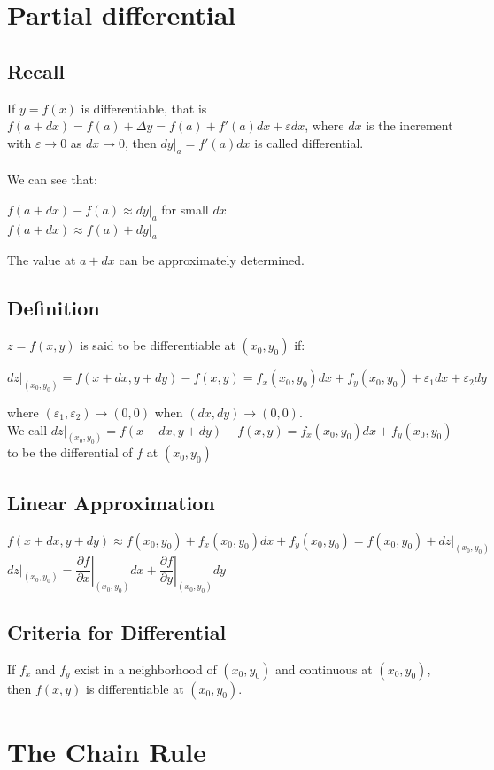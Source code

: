 \documentclass[UTF8,a4paper, 10pt, openany]{book}
\begin{document}
\section{Partial differential}
\subsection{Recall}
If $y=f(x)$ is differentiable, that is $f(a+dx)=f(a)+\Delta y=f(a)+f'(a)dx+\varepsilon dx$, where $dx$ is the increment with $\varepsilon \to 0$ as $dx \to 0$, then $dy|_{a}=f'(a)dx$ is called differential.\\ \\
We can see that:
\begin{center}
$f(a+dx)-f(a)\approx dy|_{a}$ for small $dx$\\
$f(a+dx)\approx f(a)+dy|_{a}$
\end{center}
The value at $a+dx$ can be approximately determined.
\subsection{Definition}
$z=f(x,y)$ is said to be differentiable at $(x_0,y_0)$ if:
\begin{center}
$dz|_{(x_0,y_0)}=f(x+dx,y+dy)-f(x,y)=f_x(x_0,y_0)dx+f_y(x_0,y_0)+\varepsilon_1dx+\varepsilon_2dy$
\end{center}
where $(\varepsilon_1,\varepsilon_2)\to (0,0)$ when $(dx,dy)\to (0,0)$.\\
We call $dz|_{(x_0,y_0)}=f(x+dx,y+dy)-f(x,y)=f_x(x_0,y_0)dx+f_y(x_0,y_0)$ to be the differential of $f$ at $(x_0,y_0)$
\subsection{Linear Approximation}
\begin{center}
$f(x+dx,y+dy)\approx f(x_0,y_0)+f_x(x_0,y_0)dx+f_y(x_0,y_0)=f(x_0,y_0)+dz|_{(x_0,y_0)}$\\
$dz|_{(x_0,y_0)}=\left. \dfrac{\partial f}{\partial x} \right|_{(x_0,y_0)}dx + 	\left.\dfrac{\partial f}{\partial y} \right|_{(x_0,y_0)}dy$
\end{center}
\subsection{Criteria for Differential}
If $f_x$ and $f_y$ exist in a neighborhood of $(x_0,y_0)$ and continuous at $(x_0,y_0)$, then $f(x,y)$ is differentiable at $(x_0,y_0)$.

\section{The Chain Rule}
\end{document}

